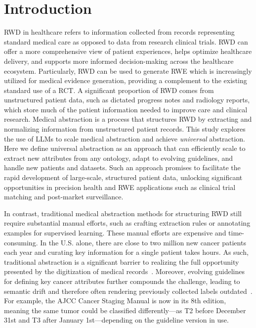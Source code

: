

\section{Introduction}

\Ac{RWD} in healthcare refers to information collected from records representing standard medical care as opposed to data from research clinical trials. 
\Ac{RWD} can offer a more comprehensive view of patient experiences, helps optimize healthcare delivery, and supports more informed decision-making across the healthcare ecosystem. Particularly, \ac{RWD} can be used to generate \ac{RWE} which is increasingly utilized for medical evidence generation, providing a complement to the existing standard use of a \ac{RCT}. A significant proportion of \ac{RWD} comes from unstructured patient data, such as dictated progress notes and radiology reports, which store much of the patient information needed to improve care and clinical research. Medical abstraction is a process that structures \ac{RWD} by extracting and normalizing information from unstructured patient records. This study explores the use of \acp{LLM} to scale medical abstraction and achieve \textit{universal} abstraction. Here we define universal abstraction as an approach that can efficiently scale to extract new attributes from any ontology, adapt to evolving guidelines, and handle new patients and datasets. Such an approach promises to facilitate the rapid development of large-scale, structured patient data, unlocking significant opportunities in precision health and \ac{RWE} applications such as clinical trial matching and post-market surveillance. 


In contrast, traditional medical abstraction methods for structuring \ac{RWD} still require substantial manual efforts, such as crafting extraction rules or annotating examples for supervised learning. These manual efforts are expensive and time-consuming. In the U.S. alone, there are close to two million new cancer patients each year and curating key information for a single patient takes hours. As such, traditional abstraction is a significant barrier to realizing the full opportunity presented by the digitization of medical records~\citep{rudrapatna2020opportunities}. 
Moreover, evolving guidelines for defining key cancer attributes further compounds the challenge, leading to semantic drift and therefore often rendering previously collected labels outdated~\cite{gao2021limitations,gao2019classifying,preston2023toward}. For example, the \ac{AJCC} Cancer Staging Manual is now in its 8th edition, meaning the same tumor could be classified differently—as T2 before December 31st and T3 after January 1st—depending on the guideline version in use.


